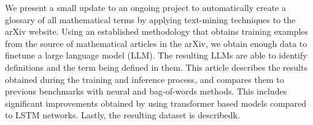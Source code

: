 We present a small update to an ongoing project to automatically create a glossary of all mathematical terms by applying text-mining techniques to the arXiv website. Using an established methodology that obtains training examples from the \latex source of mathematical articles in the arXiv, we obtain enough data to finetune a large language model (LLM). The resulting LLMs are able to identify definitions and the term being defined in them.  This article describes the results obtained during the training and inference process, and compares them to previous benchmarks with neural and bag-of-words methods. This includes  significant improvements obtained by using transformer based models compared to LSTM networks. Lastly, the resulting dataset is describedk. 

